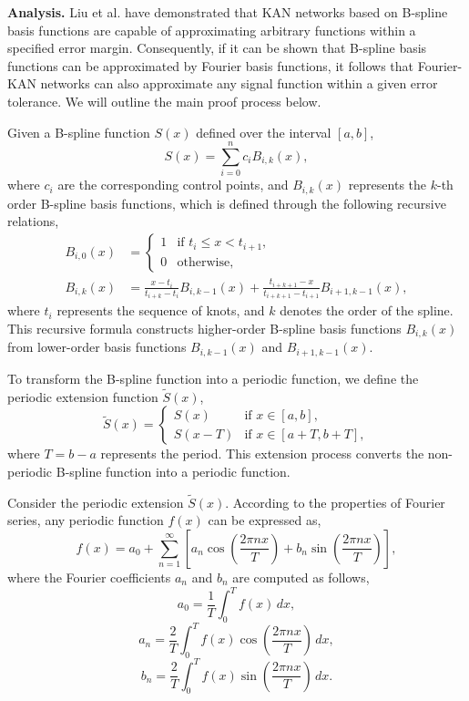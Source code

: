 \documentclass[letterpaper]{article} %
\begin{document}
\textbf{Analysis.}
Liu et al. \cite{liu2024kan} have demonstrated that KAN networks based on B-spline basis functions are capable of approximating arbitrary functions within a specified error margin. Consequently, if it can be shown that B-spline basis functions can be approximated by Fourier basis functions, it follows that Fourier-KAN networks can also approximate any signal function within a given error tolerance. We will outline the main proof process below.

Given a B-spline function \( S(x) \) defined over the interval \([a, b]\),
\[
S(x) = \sum_{i=0}^{n} c_i B_{i,k}(x),
\]
where \( c_i \) are the corresponding control points, and \( B_{i,k}(x) \) represents the \(k\)-th order B-spline basis functions, which is defined through the following recursive relations,
\begin{equation*}
\begin{aligned}
        B_{i,0}(x) &= \begin{cases}
       1 & \text{if } t_i \leq x < t_{i+1}, \\
       0 & \text{otherwise},
   \end{cases} \\
     B_{i,k}(x) &= \frac{x - t_i}{t_{i+k} - t_i} B_{i,k-1}(x) + \frac{t_{i+k+1} - x}{t_{i+k+1} - t_{i+1}} B_{i+1,k-1}(x),
\end{aligned}
\end{equation*} where \( t_i \) represents the sequence of knots, and \( k \) denotes the order of the spline. This recursive formula constructs higher-order B-spline basis functions \( B_{i,k}(x) \) from lower-order basis functions \( B_{i,k-1}(x) \) and \( B_{i+1,k-1}(x) \).

To transform the B-spline function into a periodic function, we define the periodic extension function \( \tilde{S}(x) \),
\[
\tilde{S}(x) = \begin{cases}
S(x) & \text{if } x \in [a, b], \\
S(x - T) & \text{if } x \in [a + T, b + T],
\end{cases}
\] where \( T = b - a \) represents the period. This extension process converts the non-periodic B-spline function into a periodic function.

Consider the periodic extension \( \tilde{S}(x) \). According to the properties of Fourier series, any periodic function \( f(x) \) can be expressed as,
\[
f(x) = a_0 + \sum_{n=1}^{\infty} \left[ a_n \cos\left(\frac{2\pi n x}{T}\right) + b_n \sin\left(\frac{2\pi n x}{T}\right) \right],
\]
where the Fourier coefficients \( a_n \) and \( b_n \) are computed as follows,
\[
a_0 = \frac{1}{T} \int_{0}^{T} f(x) \, dx,
\]
\[
a_n = \frac{2}{T} \int_{0}^{T} f(x) \cos\left(\frac{2\pi n x}{T}\right) \, dx,
\]
\[
b_n = \frac{2}{T} \int_{0}^{T} f(x) \sin\left(\frac{2\pi n x}{T}\right) \, dx.
\]
\end{document}
